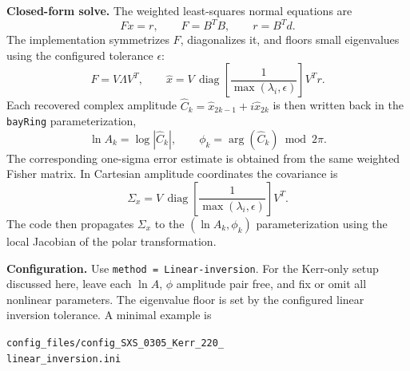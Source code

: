 \documentclass[10pt]{article}
\begin{document}
\textbf{Closed-form solve.}
The weighted least-squares normal equations are
\begin{equation}
  F x = r,
  \qquad
  F = B^T B,
  \qquad
  r = B^T d .
\end{equation}
The implementation symmetrizes \(F\), diagonalizes it, and floors small
eigenvalues using the configured tolerance \(\epsilon\):
\begin{equation}
  F = V\Lambda V^T,
  \qquad
  \hat{x}
  =
  V\,\operatorname{diag}\!\left[
      \frac{1}{\max(\lambda_i,\epsilon)}
    \right]V^T r .
\end{equation}
Each recovered complex amplitude
\(\hat{C}_k=\hat{x}_{2k-1}+i\hat{x}_{2k}\) is then written back in the
\texttt{bayRing} parameterization,
\begin{equation}
  \ln A_k = \log |\hat{C}_k|,
  \qquad
  \phi_k = \arg(\hat{C}_k) \bmod 2\pi .
\end{equation}
The corresponding one-sigma error estimate is obtained from the same weighted
Fisher matrix. In Cartesian amplitude coordinates the covariance is
\begin{equation}
  \Sigma_x =
  V\,\operatorname{diag}\!\left[
      \frac{1}{\max(\lambda_i,\epsilon)}
    \right]V^T .
\end{equation}
The code then propagates \(\Sigma_x\) to the \((\ln A_k,\phi_k)\)
parameterization using the local Jacobian of the polar transformation.

\textbf{Configuration.}
Use \texttt{method = Linear-inversion}. For the Kerr-only setup discussed here,
leave each \(\ln A\), \(\phi\) amplitude pair free, and fix or omit all
nonlinear parameters. The eigenvalue floor is set by the configured linear
inversion tolerance. A minimal example is
\begin{center}
\small
\texttt{config\_files/config\_SXS\_0305\_Kerr\_220\_}\\
\texttt{linear\_inversion.ini}
\end{center}
\end{document}

